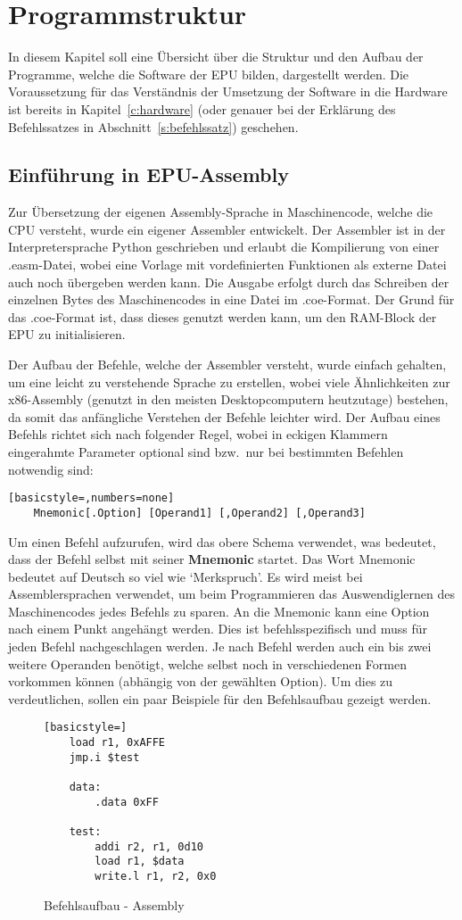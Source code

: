 \captionsetup[figure]{justification=justified,singlelinecheck=false}
\chapter{Programmstruktur}
In diesem Kapitel soll eine Übersicht über die Struktur und den Aufbau der
Programme, welche die Software der EPU bilden, dargestellt werden. Die
Voraussetzung für das Verständnis der Umsetzung der Software in die Hardware
ist bereits in Kapitel~\ref{c:hardware} (oder genauer bei der Erklärung des
Befehlssatzes in Abschnitt~\ref{s:befehlssatz}) geschehen.
\section{Einführung in EPU-Assembly}
Zur Übersetzung der eigenen Assembly-Sprache in Maschinencode, welche die CPU
versteht, wurde ein eigener Assembler entwickelt. Der Assembler ist in der
Interpretersprache Python geschrieben und erlaubt die Kompilierung von einer
.easm-Datei, wobei eine Vorlage mit vordefinierten Funktionen als externe Datei
auch noch übergeben werden kann. Die Ausgabe erfolgt durch das Schreiben der
einzelnen Bytes des Maschinencodes in eine Datei im .coe-Format. Der Grund für
das .coe-Format ist, dass dieses genutzt werden kann, um den RAM-Block der EPU
zu initialisieren.

Der Aufbau der Befehle, welche der Assembler versteht, wurde einfach
gehalten, um eine leicht zu verstehende Sprache zu erstellen, wobei viele
Ähnlichkeiten zur x86-Assembly (genutzt in den meisten Desktopcomputern
heutzutage) bestehen, da somit das anfängliche Verstehen der Befehle leichter
wird. Der Aufbau eines Befehls richtet sich nach folgender Regel, wobei in
eckigen Klammern eingerahmte Parameter optional sind bzw.\ nur bei bestimmten
Befehlen notwendig sind:
\begin{lstlisting}[basicstyle=,numbers=none]
	Mnemonic[.Option] [Operand1] [,Operand2] [,Operand3]
\end{lstlisting}

Um einen Befehl aufzurufen, wird das obere Schema verwendet, was bedeutet, dass
der Befehl selbst mit seiner \textbf{Mnemonic} startet. Das Wort Mnemonic
bedeutet auf Deutsch so viel wie `Merkspruch'. Es wird meist bei
Assemblersprachen verwendet, um beim Programmieren das Auswendiglernen des
Maschinencodes jedes Befehls zu sparen. An die Mnemonic kann eine Option nach
einem Punkt angehängt werden. Dies ist befehlsspezifisch und muss für jeden
Befehl nachgeschlagen werden. Je nach Befehl werden auch ein bis zwei weitere
Operanden benötigt, welche selbst noch in verschiedenen Formen vorkommen können
(abhängig von der gewählten Option). Um dies zu verdeutlichen, sollen ein
paar Beispiele für den Befehlsaufbau gezeigt werden.
\begin{figure}
	\begin{lstlisting}[basicstyle=]
	load r1, 0xAFFE
	jmp.i $test

	data:
		.data 0xFF

	test:
		addi r2, r1, 0d10
		load r1, $data
		write.l r1, r2, 0x0
\end{lstlisting}
\caption{Befehlsaufbau - Assembly}
\label{code:instruction_code}
\end{figure}


